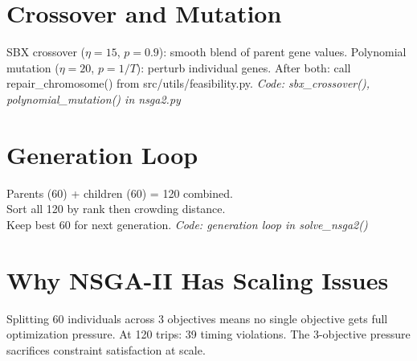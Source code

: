 \documentclass{article}
\begin{document}
\section{Crossover and Mutation}
SBX crossover ($\eta=15$, $p=0.9$): smooth blend of parent gene values.
Polynomial mutation ($\eta=20$, $p=1/T$): perturb individual genes.
After both: call repair\_chromosome() from src/utils/feasibility.py.
\textit{Code: sbx\_crossover(), polynomial\_mutation() in nsga2.py}

\section{Generation Loop}
Parents (60) + children (60) = 120 combined. \\
Sort all 120 by rank then crowding distance. \\
Keep best 60 for next generation.
\textit{Code: generation loop in solve\_nsga2()}

\section{Why NSGA-II Has Scaling Issues}
Splitting 60 individuals across 3 objectives means no single objective
gets full optimization pressure. At 120 trips: 39 timing violations.
The 3-objective pressure sacrifices constraint satisfaction at scale.
\end{document}
